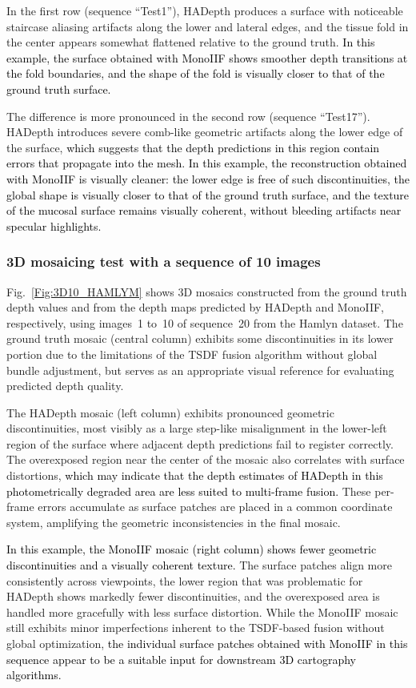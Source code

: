 \documentclass[a4paper,fleqn]{cas-dc}
\begin{document}
In the first row (sequence ``Test1''), HADepth produces a surface with noticeable staircase aliasing artifacts along the lower and lateral edges, and the tissue fold 
in the center appears somewhat flattened relative to the ground truth. \textcolor{black}{In this example, the surface obtained with MonoIIF shows smoother depth transitions at the fold boundaries, and the shape of the fold is visually closer to that of the ground truth surface.}

The difference is more pronounced in the second row (sequence ``Test17''). HADepth introduces severe comb-like geometric artifacts along the lower edge of the surface, \textcolor{black}{which suggests that the depth predictions in this region contain errors that propagate into the mesh. In this example, the reconstruction obtained with MonoIIF is visually cleaner: the lower edge is free of such discontinuities, the global shape is visually closer to that of the ground truth surface, and the texture of the mucosal surface remains visually coherent, without bleeding artifacts near specular highlights.}


\subsubsection*{3D mosaicing test with a sequence of 
10 images}
Fig.~\ref{Fig:3D10_HAMLYM} shows 3D mosaics constructed from the ground truth depth values and from the depth maps predicted by HADepth and MonoIIF, respectively, using images~1 to~10 of sequence~20 from the Hamlyn dataset. The ground truth mosaic (central column) exhibits some discontinuities in its lower portion due to the limitations of the TSDF fusion algorithm without global bundle adjustment, but serves as an appropriate visual reference for evaluating predicted depth quality.

The HADepth mosaic (left column) exhibits pronounced geometric discontinuities, most visibly as a large step-like misalignment in the lower-left region of the surface where adjacent depth predictions fail to register correctly. The overexposed region near the center of the mosaic also correlates with surface distortions, \textcolor{black}{which may indicate that the depth estimates of HADepth in this photometrically degraded area are less suited to multi-frame fusion.} These per-frame errors accumulate as surface patches are placed in a common coordinate system, amplifying the geometric inconsistencies in the final mosaic.

\textcolor{black}{In this example, the MonoIIF mosaic (right column) shows fewer geometric discontinuities and a visually coherent texture.} The surface patches align more consistently across viewpoints, the lower region that was problematic for HADepth shows markedly fewer discontinuities, and the overexposed area is handled more gracefully with less surface distortion. While the MonoIIF mosaic 
still exhibits minor imperfections inherent to the TSDF-based fusion without global optimization, \textcolor{black}{the individual surface patches obtained with MonoIIF in this sequence appear to be a suitable input for downstream 3D cartography algorithms.}
\end{document}

